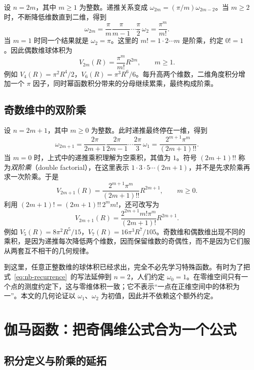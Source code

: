 \documentclass[UTF8,12pt,a4paper,fontset=fandol]{ctexart}
\begin{document}
设 $n=2m$，其中 $m\geq1$ 为整数。递推关系变成 $\omega_{2m}=(\pi/m)\omega_{2m-2}$。当 $m\geq2$ 时，不断降低维数直到二维，得到
\[
  \omega_{2m}=\frac{\pi}{m}\frac{\pi}{m-1}\cdots
  \frac{\pi}{2}\,\omega_2=\frac{\pi^m}{m!}.
\]
当 $m=1$ 时同一个结果就是 $\omega_2=\pi$。这里的 $m!=1\cdot2\cdots m$ 是阶乘，约定 $0!=1$。因此偶数维球体积为
\begin{equation}\label{eq:nb-even}
  V_{2m}(R)=\frac{\pi^m}{m!}R^{2m},\qquad m\geq1.
\end{equation}
例如 $V_4(R)=\pi^2R^4/2$，$V_6(R)=\pi^3R^6/6$。每升高两个维数，二维角度积分增加一个 $\pi$ 因子，同时幂函数积分带来的分母继续累乘，最终构成阶乘。

\subsection{奇数维中的双阶乘}

设 $n=2m+1$，其中 $m\geq0$ 为整数。此时递推最终停在一维，得到
\[
  \omega_{2m+1}
  =\frac{2\pi}{2m+1}\frac{2\pi}{2m-1}\cdots
   \frac{2\pi}{3}\,\omega_1
  =\frac{2^{m+1}\pi^m}{(2m+1)!!}.
\]
当 $m=0$ 时，上式中的递推乘积理解为空乘积，其值为 $1$。符号 $(2m+1)!!$ 称为\emph{双阶乘}（double factorial），在这里表示 $1\cdot3\cdot5\cdots(2m+1)$，并不是先求阶乘再求一次阶乘。于是
\begin{equation}\label{eq:nb-odd}
  V_{2m+1}(R)=\frac{2^{m+1}\pi^m}{(2m+1)!!}R^{2m+1},
  \qquad m\geq0.
\end{equation}
利用 $(2m+1)!=(2m+1)!!\,2^m m!$，还可改写为
\[
  V_{2m+1}(R)=\frac{2^{2m+1}m!\pi^m}{(2m+1)!}R^{2m+1}.
\]
例如 $V_5(R)=8\pi^2R^5/15$，$V_7(R)=16\pi^3R^7/105$。奇数维和偶数维出现不同的乘积，是因为递推每次降低两个维数，因而保留维数的奇偶性，而不是因为它们服从两套互不相干的几何规律。

到这里，任意正整数维的球体积已经求出，完全不必先学习特殊函数。有时为了把式~\eqref{eq:nb-recurrence}~的写法延伸到 $n=2$，人们约定 $\omega_0=1$。在零维空间只有一个点的测度约定下，这与零维体积一致；它不表示“一点在正维空间中的体积为一”。本文的几何论证以 $\omega_1$、$\omega_2$ 为初值，因此并不依赖这个额外约定。

\section{伽马函数：把奇偶维公式合为一个公式}
\label{sec:nb-gamma}

\subsection{积分定义与阶乘的延拓}
\end{document}
